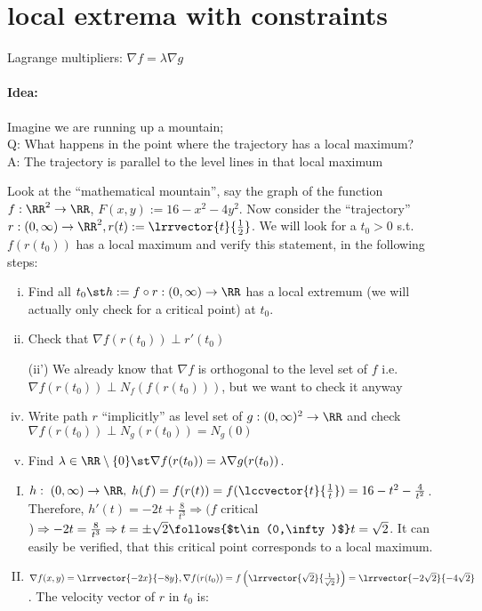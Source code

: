 \section{local extrema with constraints}
Lagrange multipliers: $\nabla f=\lambda\nabla g$\\
\paragraph{Idea:}
Imagine we are running up a mountain;\\
Q: What happens in the point where the trajectory has a local maximum?\\
A: The trajectory is parallel to the level lines in that local maximum
\begin{exam}
  Look at the ``mathematical mountain'', say the graph of the function $f:\RR^2\to\RR$, $F(x,y):=16-x^2-4y^2$. Now consider the ``trajectory'' $r:(0,\infty)\to\RR^2, r(t):=\lrrvector{t}{\frac{1}{2}}$. We will look for a $t_0>0$ s.t. $f(r(t_0))$ has a local maximum and verify this statement, in the following steps:
  \begin{enumerate}[(i)]
  	\item Find all $t_0\st h:=f\circ r:(0,\infty)\to\RR$ has a local extremum (we will actually only check for a critical point) at $t_0$.
  	\item Check that $\nabla f(r(t_0))\perp r'(t_0)$
  	\item[(ii')] We already know that $\nabla f$ is orthogonal to the level set of $f$ i.e. $\nabla f(r(t_0))\perp N_f(f(r(t_0)))$, but we want to check it anyway
  	\item Write path $r$ ``implicitly'' as level set of $g:(0,\infty)^2\to\RR$ and check $\nabla f(r(t_0))\perp N_g(r(t_0))=N_g(0)$
  	\item Find $\lambda\in\RR\setminus\{0\} \st \nabla f(r(t_0))=\lambda\nabla g(r(t_0))$.
  \end{enumerate}
  \begin{enumerate}[(I)]
  	\item $h:\;(0,\infty)\to\RR,\; h(f)=f(r(t))=f(\lccvector{t}{\frac{1}{t}})=16-t^2-\frac{4}{t^2}$. Therefore, $h'(t)=-2t+\frac{8}{t^3}\Rightarrow (f$ critical$)\Rightarrow-2t=\frac{8}{t^3}\Rightarrow t=\pm\sqrt{2}\follows{$t\in(0,\infty)$}t=\sqrt{2}$. It can easily be verified, that this critical point corresponds to a local maximum. 
  	\item $\nabla f(x,y)=\lrrvector{-2x}{-8y}, \nabla f(r(t_0))=f\left(\lrrvector{\sqrt{2}}{\frac{1}{\sqrt{2}}}\right)=\lrrvector{-2\sqrt{2}}{-4\sqrt{2}}$. The velocity vector of $r$ in $t_0$ is:

\end{enumerate}
\end{exam}
